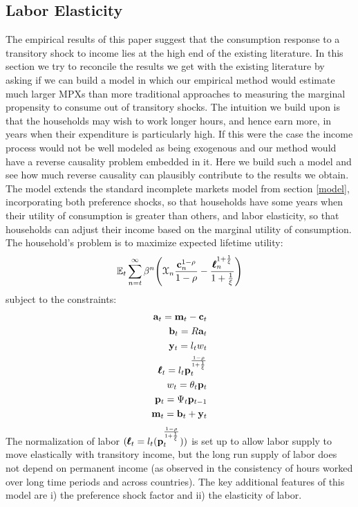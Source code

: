\documentclass[titlepage]{\econtex}\newcommand{\texname}{ConsumptionHeterogeneity}
\begin{document}
\subsection{Labor Elasticity}
The empirical results of this paper suggest that the consumption response to a transitory shock to income lies at the high end of the existing literature. In this section we try to reconcile the results we get with the existing literature by asking if we can build a model in which our empirical method would estimate much larger MPXs than more traditional approaches to measuring the marginal propensity to consume out of transitory shocks. The intuition we build upon is that the households may wish to work longer hours, and hence earn more, in years when their expenditure is particularly high. If this were the case the income process would not be well modeled as being exogenous and our method would have a reverse causality problem embedded in it. Here we build such a model and see how much reverse causality can plausibly contribute to the results we obtain.
The model extends the standard incomplete markets model from section \ref{model}, incorporating both preference shocks, so that households have some years when their utility of consumption is greater than others, and labor elasticity, so that households can adjust their income based on the marginal utility of consumption. The household's problem is to maximize expected lifetime utility:
\begin{align*}
\mathbb{E}_t \sum_{n=t}^{\infty} \beta^n \Bigg(\mathcal{X}_n \frac{ \mathbf{c}_n^{1-\rho}}{1-\rho}-\frac{\pmb{\ell}_n^{1+\frac{1}{\xi}}}{1+\frac{1}{\xi}} \Bigg)
\end{align*}
subject to the constraints:
\begin{align*}
\mathbf{a}_t = \mathbf{m}_t - \mathbf{c}_t \\
\mathbf{b}_t = R\mathbf{a}_t \\
\mathbf{y}_t =  l_t w_t \\
\pmb{\ell}_t = l_t \mathbf{p}_t^{\frac{1-\rho}{1+\frac{1}{\xi}}}\\
w_t = \theta_t \mathbf{p}_t \\
\mathbf{p}_t = \Psi_t \mathbf{p}_{t-1} \\
\mathbf{m}_t = \mathbf{b}_t + \mathbf{y}_t
\end{align*}
The normalization of labor $(\pmb{\ell}_t = l_t (\mathbf{p}_t^{\frac{1-\rho}{1+\frac{1}{\xi}}}))$ is set up to allow labor supply to move elastically with transitory income, but the long run supply of labor does not depend on permanent income (as observed in the consistency of hours worked over long time periods and across countries). The key additional features of this model are i) the preference shock factor and ii) the elasticity of labor.
\end{document}
